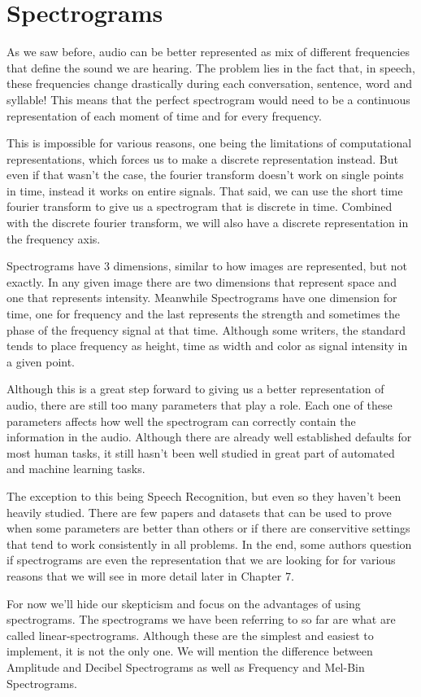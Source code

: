 \documentclass{book}
\begin{document}
\chapter{Spectrograms}
\qquad As we saw before, audio can be better represented as mix of different frequencies that define the sound we are hearing. The problem lies in the fact that, in speech, these frequencies change drastically during each conversation, sentence, word and syllable! This means that the perfect spectrogram would need to be a continuous representation of each moment of time and for every frequency.
\par
This is impossible for various reasons, one being the limitations of computational representations, which forces us to make a discrete representation instead. But even if that wasn’t the case, the fourier transform doesn’t work on single points in time, instead it works on entire signals. That said, we can use the short time fourier transform to give us a spectrogram that is discrete in time. Combined with the discrete fourier transform, we will also have a discrete representation in the frequency axis.
\par
Spectrograms have 3 dimensions, similar to how images are represented, but not exactly. In any given image there are two dimensions that represent space and one that represents intensity. Meanwhile Spectrograms have one dimension for time, one for frequency and the last represents the strength and sometimes the phase of the frequency signal at that time. Although some writers, the standard tends to place frequency as height, time as width and color as signal intensity in a given point.
\par
Although this is a great step forward to giving us a better representation of audio, there are still too many parameters that play a role. Each one of these parameters affects how well the spectrogram can correctly contain the information in the audio. Although there are already well established defaults for most human tasks, it still hasn’t been well studied in great part of automated and machine learning tasks.
\par
The exception to this being Speech Recognition, but even so they haven’t been heavily studied. There are few papers and datasets that can be used to prove when some parameters are better than others or if there are conservitive settings that tend to work consistently in all problems. In the end, some authors question if spectrograms are even the representation that we are looking for for various reasons that we will see in more detail later in Chapter 7.
\par
For now we'll hide our skepticism and focus on the advantages of using spectrograms. The spectrograms we have been referring to so far are what are called linear-spectrograms. Although these are the simplest and easiest to implement, it is not the only one. We will mention the difference between Amplitude and Decibel Spectrograms as well as Frequency and Mel-Bin Spectrograms.
\end{document}
